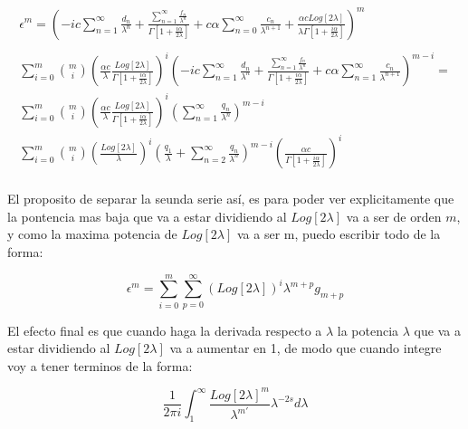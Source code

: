 \begin{equation}
\begin{array}{c}
	\epsilon ^m = 
	\left(
		- i c \sum _{n=1} ^{\infty} \frac{d _n}{\lambda ^n} +
		\frac{\sum _{n=1} ^{\infty} \frac{f _n}{\lambda ^n}}
			 {\Gamma[1+ \frac{i \alpha}{2 \lambda}]}		
		+ c \alpha \sum _{n=0} ^{\infty} \frac{c _n}{\lambda ^{n+1}} +
		\frac{\alpha c Log[2 \lambda]}{\lambda \Gamma [1 + \frac{i \alpha}{2 \lambda} ]}
		\right) ^m \\ \\
\sum _{i=0} ^{m}
{m\choose i}
\left(
	\frac{\alpha c}{\lambda} \frac{Log [2 \lambda]}{\Gamma [1 + \frac{i \alpha}{2 \lambda}]}
	\right) ^{i}
\left(
	- i c \sum _{n=1} ^{\infty} \frac{d _n}{\lambda ^n} +
	\frac{\sum _{n=1} ^{\infty} \frac{f _n}{\lambda ^{n}}}
		{\Gamma[1+ \frac{i \alpha}{2 \lambda}]}		
		+ c \alpha \sum _{n=1} ^{\infty} \frac{c _n}{\lambda ^{n+1}} 
	\right) ^{m-i } = \\
\sum _{i=0} ^{m}
{m\choose i}
\left(
	\frac{\alpha c}{\lambda} \frac{Log [2 \lambda]}{\Gamma [1+ \frac{i \alpha}{2 \lambda}]}
	\right) ^{i} 
\left(
	\sum _{n=1} ^{\infty} \frac{q_n}{\lambda ^n}
\right) ^{m-i} \\
\sum _{i=0} ^{m}
{m\choose i}
\left(
	\frac{Log [2 \lambda]}{ \lambda }
	\right) ^{i} 
\left(
	\frac{q_1}{\lambda} + \sum _{n=2} ^{\infty} \frac{q_n}{\lambda ^n}
\right) ^{m-i} 
\left(
	\frac{\alpha c}{\Gamma [1+ \frac{i \alpha}{2 \lambda}]}
	\right) ^i \\
\end{array}
\end{equation}

El proposito de separar la seunda serie así, es para poder ver explicitamente que la pontencia mas baja que va a estar dividiendo al $Log[2 \lambda] $ va a ser de orden $m$, y como la maxima potencia de $Log[2 \lambda]$ va a ser m, puedo escribir todo de la forma:

\begin{equation}
\epsilon ^m = 
\sum _{i=0} ^m \sum _{p=0} ^{\infty} { (Log[2 \lambda]) ^i}{\lambda ^{m+p}} g _{m+p}
\end{equation}


El efecto final es que cuando haga la derivada respecto a $\lambda$ la potencia $\lambda$ que va a estar dividiendo al $Log[2 \lambda]$ va a aumentar en 1, de modo que cuando integre voy a tener terminos de la forma:

\begin{equation}
\frac{1}{2 \pi i} 
\int _{1} ^{\infty} \frac{Log[2 \lambda] ^{m}}{\lambda ^{m'}} \lambda ^{-2s} d \lambda
\end{equation}

